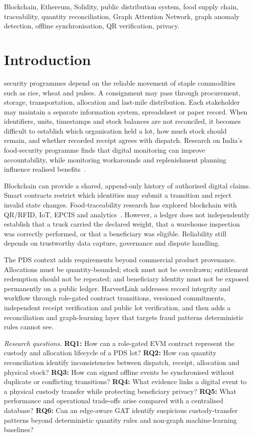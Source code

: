 \documentclass[conference,a4paper]{IEEEtran}
\begin{document}
\begin{IEEEkeywords}
Blockchain, Ethereum, Solidity, public distribution system, food supply chain, traceability, quantity reconciliation, Graph Attention Network, graph anomaly detection, offline synchronisation, QR verification, privacy.
\end{IEEEkeywords}

\section{Introduction}
 security programmes depend on the reliable movement of staple commodities such as rice, wheat and pulses. A consignment may pass through procurement, storage, transportation, allocation and last-mile distribution. Each stakeholder may maintain a separate information system, spreadsheet or paper record. When identifiers, units, timestamps and stock balances are not reconciled, it becomes difficult to establish which organisation held a lot, how much stock should remain, and whether recorded receipt agrees with dispatch. Research on India's food-security programme finds that digital monitoring can improve accountability, while monitoring workarounds and replenishment planning influence realised benefits~\cite{ganesh2024}.

Blockchain can provide a shared, append-only history of authorised digital claims. Smart contracts restrict which identities may submit a transition and reject invalid state changes. Food-traceability research has explored blockchain with QR/RFID, IoT, EPCIS and analytics~\cite{ellahi2023,sugandh2023,elhajji2024,chunduri2024}. However, a ledger does not independently establish that a truck carried the declared weight, that a warehouse inspection was correctly performed, or that a beneficiary was eligible. Reliability still depends on trustworthy data capture, governance and dispute handling.

The PDS context adds requirements beyond commercial product provenance. Allocations must be quantity-bounded; stock must not be overdrawn; entitlement redemption should not be repeated; and beneficiary identity must not be exposed permanently on a public ledger. HarvestLink addresses record integrity and workflow through role-gated contract transitions, versioned commitments, independent receipt verification and public lot verification, and then adds a reconciliation and graph-learning layer that targets fraud patterns deterministic rules cannot see.

\textit{Research questions.} \textbf{RQ1:} How can a role-gated EVM contract represent the custody and allocation lifecycle of a PDS lot? \textbf{RQ2:} How can quantity reconciliation identify inconsistencies between dispatch, receipt, allocation and physical stock? \textbf{RQ3:} How can signed offline events be synchronised without duplicate or conflicting transitions? \textbf{RQ4:} What evidence links a digital event to a physical custody transfer while protecting beneficiary privacy? \textbf{RQ5:} What performance and operational trade-offs arise compared with a centralised database? \textbf{RQ6:} Can an edge-aware GAT identify suspicious custody-transfer patterns beyond deterministic quantity rules and non-graph machine-learning baselines?
\end{document}
